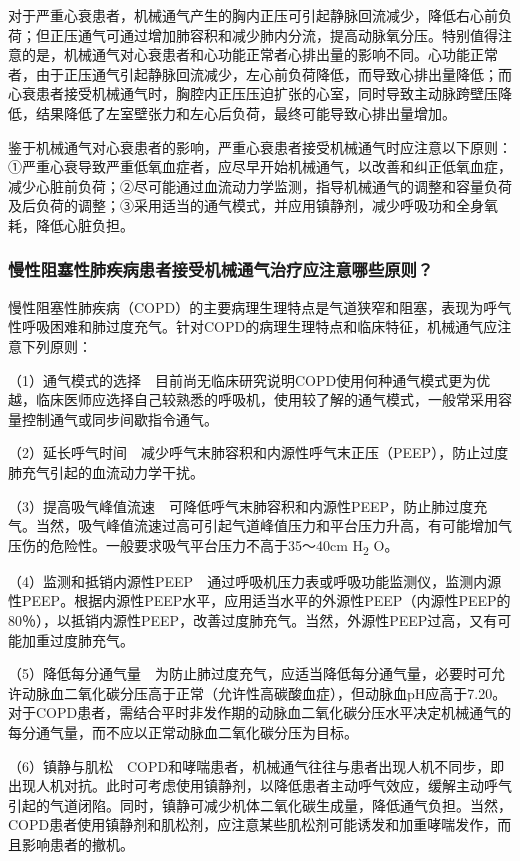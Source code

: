 对于严重心衰患者，机械通气产生的胸内正压可引起静脉回流减少，降低右心前负荷；但正压通气可通过增加肺容积和减少肺内分流，提高动脉氧分压。特别值得注意的是，机械通气对心衰患者和心功能正常者心排出量的影响不同。心功能正常者，由于正压通气引起静脉回流减少，左心前负荷降低，而导致心排出量降低；而心衰患者接受机械通气时，胸腔内正压压迫扩张的心室，同时导致主动脉跨壁压降低，结果降低了左室壁张力和左心后负荷，最终可能导致心排出量增加。

鉴于机械通气对心衰患者的影响，严重心衰患者接受机械通气时应注意以下原则：①严重心衰导致严重低氧血症者，应尽早开始机械通气，以改善和纠正低氧血症，减少心脏前负荷；②尽可能通过血流动力学监测，指导机械通气的调整和容量负荷及后负荷的调整；③采用适当的通气模式，并应用镇静剂，减少呼吸功和全身氧耗，降低心脏负担。

\subsubsection{慢性阻塞性肺疾病患者接受机械通气治疗应注意哪些原则？}

慢性阻塞性肺疾病（COPD）的主要病理生理特点是气道狭窄和阻塞，表现为呼气性呼吸困难和肺过度充气。针对COPD的病理生理特点和临床特征，机械通气应注意下列原则：

（1）通气模式的选择　目前尚无临床研究说明COPD使用何种通气模式更为优越，临床医师应选择自己较熟悉的呼吸机，使用较了解的通气模式，一般常采用容量控制通气或同步间歇指令通气。

（2）延长呼气时间　减少呼气末肺容积和内源性呼气末正压（PEEP），防止过度肺充气引起的血流动力学干扰。

（3）提高吸气峰值流速　可降低呼气末肺容积和内源性PEEP，防止肺过度充气。当然，吸气峰值流速过高可引起气道峰值压力和平台压力升高，有可能增加气压伤的危险性。一般要求吸气平台压力不高于35～40cm
H\textsubscript{2} O。

（4）监测和抵销内源性PEEP　通过呼吸机压力表或呼吸功能监测仪，监测内源性PEEP。根据内源性PEEP水平，应用适当水平的外源性PEEP（内源性PEEP的80％），以抵销内源性PEEP，改善过度肺充气。当然，外源性PEEP过高，又有可能加重过度肺充气。

（5）降低每分通气量　为防止肺过度充气，应适当降低每分通气量，必要时可允许动脉血二氧化碳分压高于正常（允许性高碳酸血症），但动脉血pH应高于7.20。对于COPD患者，需结合平时非发作期的动脉血二氧化碳分压水平决定机械通气的每分通气量，而不应以正常动脉血二氧化碳分压为目标。

（6）镇静与肌松　COPD和哮喘患者，机械通气往往与患者出现人机不同步，即出现人机对抗。此时可考虑使用镇静剂，以降低患者主动呼气效应，缓解主动呼气引起的气道闭陷。同时，镇静可减少机体二氧化碳生成量，降低通气负担。当然，COPD患者使用镇静剂和肌松剂，应注意某些肌松剂可能诱发和加重哮喘发作，而且影响患者的撤机。

